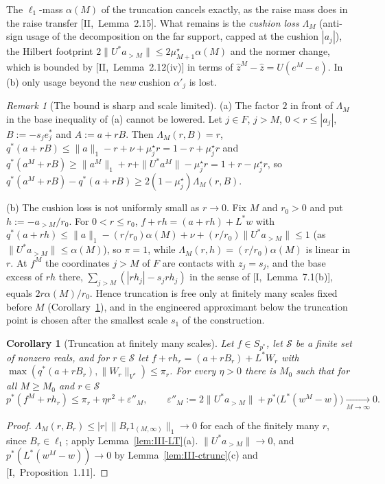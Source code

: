 \documentclass[10pt]{amsart}
\newtheorem{corollary}[theorem]{Corollary}
\theoremstyle{definition}
\theoremstyle{remark}
\newtheorem{remark}[theorem]{Remark}
\newcommand{\zh}{\hat z}
\begin{document}
The $\ell_1$-mass $\alpha(M)$ of the truncation cancels exactly, as the raise
mass does in the raise transfer [II,~Lemma~2.15].  What remains is the
\emph{cushion loss} $\Lambda_M$ (anti-sign usage of the decomposition on the
far support, capped at the cushion $|a_j|$), the Hilbert footprint
$2\|U^*a_{>M}\|\le2\mu^\star_{M+1}\alpha(M)$ and the normer change, which is
bounded by [II,~Lemma~2.12(iv)] in terms of $\zh^M-\zh=U(e^M-e)$.  In (b)
only usage beyond the \emph{new} cushion $\alpha'_j$ is lost.

\begin{remark}[The bound is sharp and scale limited]\label{rem:III-LTsharp}
(a) The factor $2$ in front of $\Lambda_M$ in the base inequality of (a)
cannot be lowered.  Let $j\in F$, $j>M$, $0<r\le|a_j|$, $B:=-s_je^*_j$ and
$A:=a+rB$.  Then $\Lambda_M(r,B)=r$, $q^*(a+rB)\le\|a\|_1-r+\nu+
\mu^\star_jr=1-r+\mu^\star_jr$ and $q^*(a^M+rB)\ge\|a^M\|_1+r+\|U^*a^M\|-
\mu^\star_jr=1+r-\mu^\star_jr$, so
$q^*(a^M+rB)-q^*(a+rB)\ge2(1-\mu^\star_j)\Lambda_M(r,B)$.

(b) The cushion loss is not uniformly small as $r\to0$.  Fix $M$ and $r_0>0$
and put $h:=-a_{>M}/r_0$.  For $0<r\le r_0$, $f+rh=(a+rh)+L^*w$ with
$q^*(a+rh)\le\|a\|_1-(r/r_0)\alpha(M)+\nu+(r/r_0)\|U^*a_{>M}\|\le1$ (as
$\|U^*a_{>M}\|\le\alpha(M)$), so $\pi=1$, while $\Lambda_M(r,h)=
(r/r_0)\alpha(M)$ is linear in $r$.  At $f^M$ the coordinates $j>M$ of $F$
are contacts with $z_j=s_j$, and the base excess of $rh$ there,
$\sum_{j>M}(|rh_j|-s_jrh_j)$ in the sense of [I,~Lemma~7.1(b)], equals
$2r\alpha(M)/r_0$.  Hence truncation is free only at finitely many scales
fixed before $M$ (Corollary~\ref{cor:III-LTwin}), and in the engineered
approximant below the truncation point is chosen after the smallest scale
$s_1$ of the construction.
\end{remark}

\begin{corollary}[Truncation at finitely many scales]\label{cor:III-LTwin}
Let $f\in S_{p^*}$, let $\mathcal S$ be a finite set of nonzero reals, and
for $r\in\mathcal S$ let $f+rh_r=(a+rB_r)+L^*W_r$ with $\max(q^*(a+rB_r),
\|W_r\|_{V^*})\le\pi_r$.  For every $\eta>0$ there is $M_0$ such that for all
$M\ge M_0$ and $r\in\mathcal S$
\[
 p^*(f^M+rh_r)\le\pi_r+\eta r^2+\varepsilon''_M,\qquad\varepsilon''_M:=
 2\|U^*a_{>M}\|+p^*\big(L^*(w^M-w)\big)\xrightarrow[M\to\infty]{}0 .
\]
\end{corollary}

\begin{proof}
$\Lambda_M(r,B_r)\le|r|\,\|B_r1_{(M,\infty)}\|_1\to0$ for each of the finitely
many $r$, since $B_r\in\ell_1$; apply Lemma~\ref{lem:III-LT}(a).
$\|U^*a_{>M}\|\to0$, and $p^*(L^*(w^M-w))\to0$ by
Lemma~\ref{lem:III-ctrunc}(c) and [I,~Proposition~1.11].
\end{proof}
\end{document}
